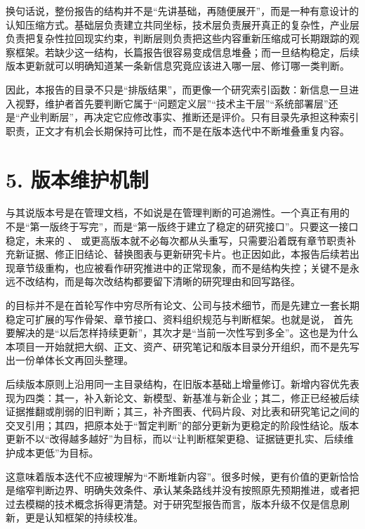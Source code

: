 换句话说，整份报告的结构并不是“先讲基础，再随便展开”，而是一种有意设计的认知压缩方式。基础层负责建立共同坐标，技术层负责展开真正的复杂性，产业层负责把复杂性拉回现实约束，判断层则负责把这些内容重新压缩成可长期跟踪的观察框架。若缺少这一结构，长篇报告很容易变成信息堆叠；而一旦结构稳定，后续版本更新就可以明确知道某一条新信息究竟应该进入哪一层、修订哪一类判断。

因此，本报告的目录不只是“排版结果”，而更像一个研究索引函数：新信息一旦进入视野，维护者首先要判断它属于“问题定义层”“技术主干层”“系统部署层”还是“产业判断层”，再决定它应修改事实、推断还是评价。只有目录先承担这种索引职责，正文才有机会长期保持可比性，而不是在版本迭代中不断堆叠重复内容。

\section*{5. 版本维护机制}

与其说版本号是在管理文档，不如说是在管理判断的可追溯性。一个真正有用的 \texttt{} 不是“第一版终于写完”，而是“第一版终于建立了稳定的研究接口”。只要这一接口稳定，未来的 \texttt{}、\texttt{} 或更高版本就不必每次都从头重写，只需要沿着既有章节职责补充新证据、修正旧结论、替换图表与更新研究卡片。也正因如此，本报告后续若出现章节级重构，也应被看作研究推进中的正常现象，而不是结构失控；关键不是永远不改结构，而是每次改结构都要留下清晰的研究理由和回写路径。

\texttt{} 的目标并不是在首轮写作中穷尽所有论文、公司与技术细节，而是先建立一套长期稳定可扩展的写作骨架、章节接口、资料组织规范与判断框架。也就是说，\texttt{} 首先要解决的是“以后怎样持续更新”，其次才是“当前一次性写到多全”。这也是为什么本项目一开始就把大纲、正文、资产、研究笔记和版本目录分开组织，而不是先写出一份单体长文再回头整理。

后续版本原则上沿用同一主目录结构，在旧版本基础上增量修订。新增内容优先表现为四类：其一，补入新论文、新模型、新基准与新企业；其二，修正已经被后续证据推翻或削弱的旧判断；其三，补齐图表、代码片段、对比表和研究笔记之间的交叉引用；其四，把原本处于“暂定判断”的部分更新为更稳定的阶段性结论。版本更新不以“改得越多越好”为目标，而以“让判断框架更稳、证据链更扎实、后续维护成本更低”为目标。

这意味着版本迭代不应被理解为“不断堆新内容”。很多时候，更有价值的更新恰恰是缩窄判断边界、明确失效条件、承认某条路线并没有按照原先预期推进，或者把过去模糊的技术概念拆得更清楚。对于研究型报告而言，版本升级不仅是信息刷新，更是认知框架的持续校准。

